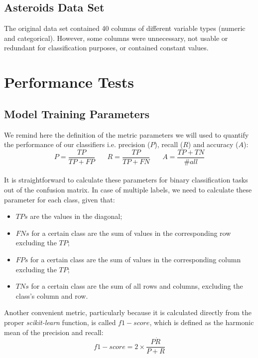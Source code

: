 \documentclass{article}
\begin{document}
\subsection{Asteroids Data Set}
The original data set contained 40 columns of different variable types (numeric and categorical). However, some columns were unnecessary, not usable or redundant for classification purposes, or contained constant values.




\section{Performance Tests}
\subsection{Model Training Parameters}
We remind here the definition of the metric parameters we will used to quantify the performance of our classifiers i.e. precision ($P$), recall ($R$) and accuracy ($A$):
\\

\begin{equation}
P = \frac{TP}{TP + FP} \ \ \ \ \ \ \ \  R = \frac{TP}{TP + FN} \ \ \ \ \ \ \ \  A = \frac{TP + TN}{\#all}
\end{equation}
\\

It is straightforward to calculate these parameters for binary classification tasks out of the confusion matrix. In case of multiple labels, we need to calculate these parameter for each class, given that:
\begin{itemize}
	\item  $TPs$ are the values in the diagonal; \
	\item  $FNs$ for a certain class are the sum of values in the corresponding row excluding the $TP$; \
	\item  $FPs$ for a certain class are the sum of values in the corresponding column excluding the $TP$; \
	\item  $TNs$ for a certain class are the sum of all rows and columns, excluding the class's column and row. \
\end{itemize}


Another convenient metric, particularly because it is calculated directly from the proper \textit{scikit-learn} function, is called $f1-score$, which is defined as the harmonic mean of the precision and recall:
\begin{equation}
f1-score = 2 \times \frac{P \dot R }{P + R }
\end{equation}
\end{document}
